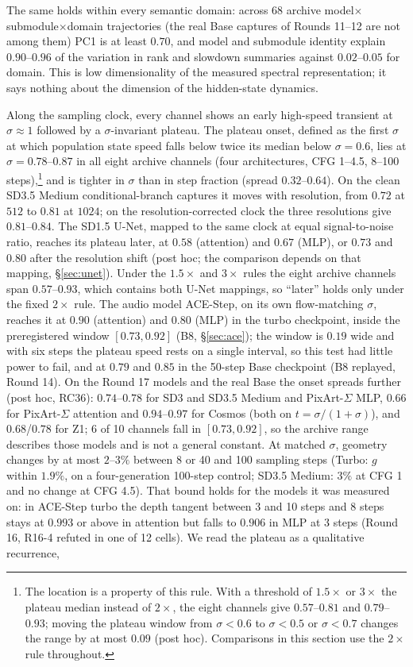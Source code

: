 \documentclass[11pt]{article}
\begin{document}
The same holds within every semantic domain: across 68 archive model$\times$submodule$\times$domain trajectories (the real Base captures of Rounds 11--12 are not among them) PC1 is at least $0.70$, and model and submodule identity explain $0.90$--$0.96$ of the variation in rank and slowdown summaries against $0.02$--$0.05$ for domain. This is low dimensionality of the measured spectral representation; it says nothing about the dimension of the hidden-state dynamics.

Along the sampling clock, every channel shows an early high-speed transient at $\sigma\approx1$ followed by a $\sigma$-invariant plateau. The plateau onset, defined as the first $\sigma$ at which population state speed falls below twice its median below $\sigma=0.6$, lies at $\sigma=0.78$--$0.87$ in all eight archive channels (four architectures, CFG 1--4.5, 8--100 steps),\footnote{The location is a property of this rule. With a threshold of $1.5\times$ or $3\times$ the plateau median instead of $2\times$, the eight channels give $0.57$--$0.81$ and $0.79$--$0.93$; moving the plateau window from $\sigma<0.6$ to $\sigma<0.5$ or $\sigma<0.7$ changes the range by at most $0.09$ (post hoc). Comparisons in this section use the $2\times$ rule throughout.} and is tighter in $\sigma$ than in step fraction (spread $0.32$--$0.64$). On the clean SD3.5 Medium conditional-branch captures it moves with resolution, from $0.72$ at $512$ to $0.81$ at $1024$; on the resolution-corrected clock the three resolutions give $0.81$--$0.84$. The SD1.5 U-Net, mapped to the same clock at equal signal-to-noise ratio, reaches its plateau later, at $0.58$ (attention) and $0.67$ (MLP), or $0.73$ and $0.80$ after the resolution shift (post hoc; the comparison depends on that mapping, \S\ref{sec:unet}). Under the $1.5\times$ and $3\times$ rules the eight archive channels span $0.57$--$0.93$, which contains both U-Net mappings, so ``later'' holds only under the fixed $2\times$ rule. The audio model ACE-Step, on its own flow-matching $\sigma$, reaches it at $0.90$ (attention) and $0.80$ (MLP) in the turbo checkpoint, inside the preregistered window $[0.73,0.92]$ (B8, \S\ref{sec:ace}); the window is $0.19$ wide and with six steps the plateau speed rests on a single interval, so this test had little power to fail, and at $0.79$ and $0.85$ in the 50-step Base checkpoint (B8 replayed, Round 14). On the Round 17 models and the real Base the onset spreads further (post hoc, RC36): $0.74$--$0.78$ for SD3 and SD3.5 Medium and PixArt-$\Sigma$ MLP, $0.66$ for PixArt-$\Sigma$ attention and $0.94$--$0.97$ for Cosmos (both on $t=\sigma/(1+\sigma)$), and $0.68$/$0.78$ for Z1; 6 of 10 channels fall in $[0.73,0.92]$, so the archive range describes those models and is not a general constant. At matched $\sigma$, geometry changes by at most $2$--$3\%$ between 8 or 40 and 100 sampling steps (Turbo: $g$ within $1.9\%$, on a four-generation 100-step control; SD3.5 Medium: $3\%$ at CFG 1 and no change at CFG 4.5). That bound holds for the models it was measured on: in ACE-Step turbo the depth tangent between 3 and 10 steps and 8 steps stays at $0.993$ or above in attention but falls to $0.906$ in MLP at 3 steps (Round 16, R16-4 refuted in one of 12 cells). We read the plateau as a qualitative recurrence, 
\end{document}
